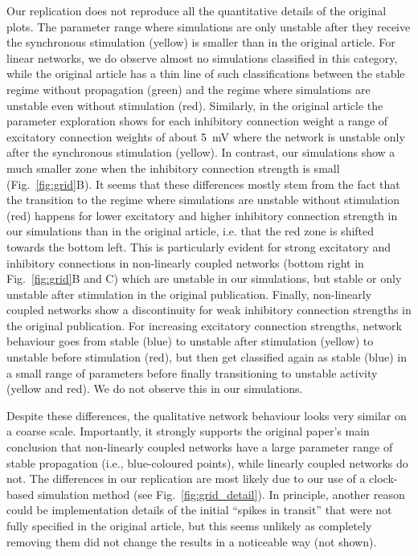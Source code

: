 \documentclass[10pt,a4paper,onecolumn]{article}
\begin{document}
Our replication does not reproduce all the quantitative details of the original plots. The parameter range where simulations are only unstable after they receive the synchronous stimulation (yellow) is smaller than in the original article. For linear networks, we do observe almost no simulations classified in this category, while the original article has a thin line of such classifications between the stable regime without propagation (green) and the regime where simulations are unstable even without stimulation (red). Similarly, in the original article the parameter exploration shows for each inhibitory connection weight a range of excitatory connection weights of about \SI{5}{\milli\volt} where the network is unstable only after the synchronous stimulation (yellow). In contrast, our simulations show a much smaller zone when the inhibitory connection strength is small (Fig.~\ref{fig:grid}B). It seems that these differences mostly stem from the fact that the transition to the regime where simulations are unstable without stimulation (red) happens for lower excitatory and higher inhibitory connection strength in our simulations than in the original article, i.e. that the red zone is shifted towards the bottom left. This is particularly evident for strong excitatory and inhibitory connections in non-linearly coupled networks (bottom right in Fig.~\ref{fig:grid}B and C) which are unstable in our simulations, but stable or only unstable after stimulation in the original publication. Finally, non-linearly coupled networks show a discontinuity for weak inhibitory connection strengths in the original publication. For increasing excitatory connection strengths, network behaviour goes from stable (blue) to unstable after stimulation (yellow) to unstable before stimulation (red), but then get classified again as stable (blue) in a small range of parameters before finally transitioning to unstable activity (yellow and red). We do not observe this in our simulations.

Despite these differences, the qualitative network behaviour looks very similar on a coarse scale. Importantly, it strongly supports the original paper's main conclusion that non-linearly coupled networks have a large parameter range of stable propagation (i.e., blue-coloured points), while linearly coupled networks do not. The differences in our replication are most likely due to our use of a clock-based simulation method  (see Fig.~\ref{fig:grid_detail}). In principle, another reason could be implementation details of the initial ``spikes in transit'' that were not fully specified in the original article, but this seems unlikely as completely removing them did not change the results in a noticeable way (not shown).
\end{document}

